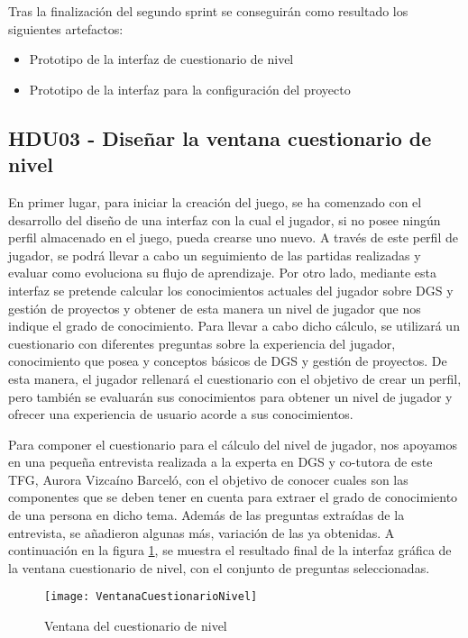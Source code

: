 Tras la finalización del segundo sprint se conseguirán como resultado los siguientes artefactos:
\begin{itemize}
	\item Prototipo de la interfaz de cuestionario de nivel
	\item Prototipo de la interfaz para la configuración del proyecto
\end{itemize}

\subsection{HDU03 - Diseñar la ventana cuestionario de nivel}
\label{sec:HDU03}

En primer lugar, para iniciar la creación del juego, se ha comenzado con el desarrollo del diseño de una interfaz con la cual el jugador, si no posee ningún perfil almacenado en el juego, pueda crearse uno nuevo. A través de este perfil de jugador, se podrá llevar a cabo un seguimiento de las partidas realizadas y evaluar como evoluciona su flujo de aprendizaje. Por otro lado, mediante esta interfaz se pretende calcular los conocimientos actuales del jugador sobre DGS y gestión de proyectos y obtener de esta manera un nivel de jugador que nos indique el grado de conocimiento. Para llevar a cabo dicho cálculo, se utilizará un cuestionario con diferentes preguntas sobre la experiencia del jugador, conocimiento que posea y conceptos básicos de DGS y gestión de proyectos. De esta manera, el jugador rellenará el cuestionario con el objetivo de crear un perfil, pero también se evaluarán sus conocimientos para obtener un nivel de jugador y ofrecer una experiencia de usuario acorde a sus conocimientos. 

Para componer el cuestionario para el cálculo del nivel de jugador, nos apoyamos en una pequeña entrevista realizada a la experta en DGS y co-tutora de este TFG, Aurora Vizcaíno Barceló, con el objetivo de conocer cuales son las componentes que se deben tener en cuenta para extraer el grado de conocimiento de una persona en dicho tema. Además de las preguntas extraídas de la entrevista, se añadieron algunas más, variación de las ya obtenidas. A continuación en la figura \ref{fig:VentanaCuestionarioNivel}, se muestra el resultado final de la interfaz gráfica de la ventana cuestionario de nivel, con el conjunto de preguntas seleccionadas.

\begin{figure}[htb]
	\centering
	\texttt{[image: VentanaCuestionarioNivel]}
	\caption[Ventana del cuestionario de nivel]{Ventana del cuestionario de nivel}
	\label{fig:VentanaCuestionarioNivel}
\end{figure}

